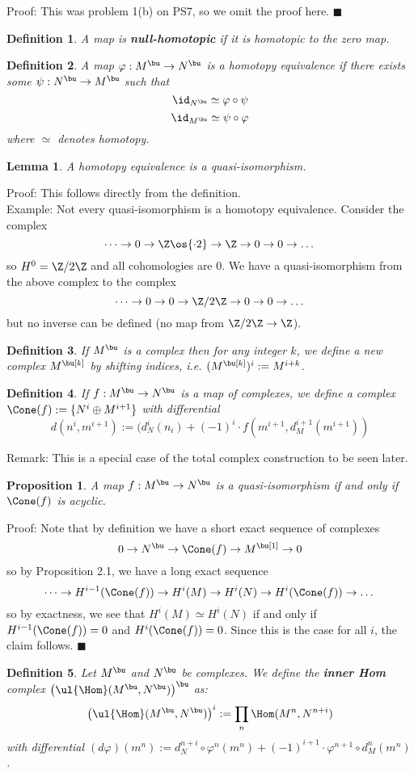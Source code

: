 \documentclass[10 pt]{article}
\newtheorem{lem}{Lemma}[section]
\newtheorem{prop}{Proposition}[section]
\newtheorem{defn}{Definition}[section]
\newcommand\bdefn{\begin{defn}}
\newcommand\blem{\begin{lem}}
\newcommand\bprop{\begin{prop}}
\newcommand\edefn{\end{defn}}
\newcommand\elem{\end{lem}}
\newcommand\eprop{\end{prop}}
\begin{document}
Proof:  This was problem 1(b) on PS7, so we omit the proof here. $\blacksquare$

\bdefn A map is {\bf null-homotopic} if it is homotopic to the zero map.\edefn

\bdefn A map $\varphi:M^\bu\rightarrow N^\bu$ is a homotopy equivalence if there exists some $\psi:N^\bu\rightarrow M^\bu$ such that
$$\id_{N^\bu}\simeq \varphi\circ \psi$$
$$\id_{M^\bu}\simeq \psi\circ \varphi$$
where $\simeq$ denotes homotopy.
\edefn

\blem A homotopy equivalence is a quasi-isomorphism.\elem

Proof:  This follows directly from the definition.\\

Example:  Not every quasi-isomorphism is a homotopy equivalence.  Consider the complex
$$\dots \rightarrow 0\rightarrow\Z\os{\cdot 2}\rightarrow \Z\rightarrow 0\rightarrow 0\rightarrow\dots$$
so $H^0=\Z/2\Z$ and all cohomologies are 0.  We have a quasi-isomorphism from the above complex to the complex
$$\dots \rightarrow 0\rightarrow 0 \rightarrow \Z/2\Z\rightarrow 0\rightarrow 0\rightarrow\dots$$
but no inverse can be defined (no map from $\Z/2\Z\rightarrow \Z$).

\bdefn If $M^\bu$ is a complex then for any integer $k$, we define a new complex $M^\bu[k]$ by shifting indices, i.e. $(M^\bu[k])^i:=M^{i+k}$.\edefn

\bdefn If $f:M^\bu\rightarrow N^\bu$ is a map of complexes, we define a complex $\Cone(f):=\{N^i\oplus M^{i+1}\}$ with differential
$$d(n^i,m^{i+1}):= (d_N^i(n_i)+(-1)^i\cdot f(m^{i+1}, d_M^{i+1}(m^{i+1}))$$
\edefn

Remark:  This is a special case of the total complex construction to be seen later.

\bprop A map $f:M^\bu\rightarrow N^\bu$ is a quasi-isomorphism if and only if $\Cone(f)$ is acyclic.\eprop

Proof:  Note that by definition we have a short exact sequence of complexes
$$0\rightarrow N^\bu\rightarrow \Cone(f)\rightarrow M^\bu[1]\rightarrow 0$$
so by Proposition 2.1, we have a long exact sequence
$$\dots \rightarrow H^{i-1}(\Cone(f))\rightarrow H^{i}(M)\rightarrow H^{i}(N)\rightarrow H^{i}(\Cone(f))\rightarrow\dots$$
so by exactness, we see that $H^i(M)\simeq H^i(N)$ if and only if $H^{i-1}(\Cone(f))=0$ and $H^i(\Cone(f))=0$.  Since this is the case for all $i$, the claim follows. $\blacksquare$

\bdefn Let $M^\bu$ and $N^\bu$ be complexes. We define the {\bf inner Hom} complex $\left(\ul{\Hom}(M^\bu,N^\bu)\right)^\bu$ as:
$$\left(\ul{\Hom}(M^\bu,N^\bu)\right)^i:= \prod_n \Hom(M^n,N^{n+i})$$
with differential $(d\varphi)(m^n):=d_N^{n+i}\circ\varphi^n(m^n)+ (-1)^{i+1}\cdot \varphi^{n+1}\circ d_M^n(m^n)$.
\edefn
\end{document}
